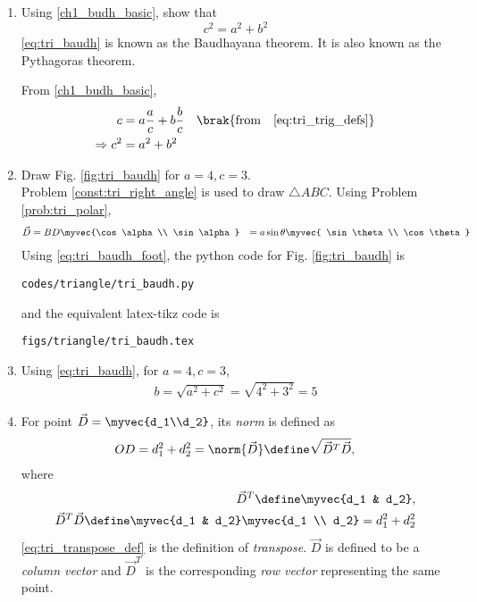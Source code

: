\begin{enumerate}[label=\arabic*.,ref=\thesubsection.\theenumi]
\item
	Using \eqref{ch1_budh_basic}, show that
	\begin{equation}
	\label{eq:tri_baudh}
	c^2 = a^2 + b^2
	\end{equation}
	\eqref{eq:tri_baudh} is known as the Baudhayana theorem.  It is also known as the Pythagoras theorem.

\solution From \eqref{ch1_budh_basic},
\begin{align}
c &= a\frac{a}{c} + b \frac{b}{c} \quad \brak{\text{from} \quad \eqref{eq:tri_trig_defs}}\\
\Rightarrow c^2 &= a^2 + b^2
\end{align}
%
%
\item Draw Fig. \ref{fig:tri_baudh} for $a = 4, c =3$.
\label{const:tri_baudh}
%
\\
\solution Problem \ref{const:tri_right_angle} is used to draw $\triangle ABC$.
%
Using Problem \ref{prob:tri_polar},
\begin{align}
\vec{D} &= BD\myvec{\cos \alpha\\  \sin \alpha} 
&= a \sin \theta \myvec{ \sin \theta \\ \cos \theta } 
\label{eq:tri_baudh_foot}
\end{align}
%
Using \eqref{eq:tri_baudh_foot}, the python code for  Fig. \ref{fig:tri_baudh} is
\begin{lstlisting}
codes/triangle/tri_baudh.py
\end{lstlisting}
%
and the equivalent latex-tikz code is
%
\begin{lstlisting}
figs/triangle/tri_baudh.tex
\end{lstlisting}
%
\item Using 	\eqref{eq:tri_baudh}, for $a = 4, c = 3$,
%
\begin{align}
b = \sqrt{a^2+c^2} = \sqrt{4^2+3^2} = 5
\end{align}
%
\item For  point $\vec{D} = \myvec{d_1\\d_2}$, its {\em norm} is defined as
%
\begin{align}
OD = d_1^2+d_2^2 = \norm{\vec{D}} \define \sqrt{\vec{D}^T\vec{D}}, 
\label{eq:tri_norm_def}
\end{align}
%
where 
%
\begin{align}
\label{eq:tri_transpose_def}
 \vec{D}^T  \define \myvec{d_1 & d_2},
\\
\vec{D}^T\vec{D} \define \myvec{d_1 & d_2} \myvec{d_1 \\ d_2} = d_1^2+d_2^2
\end{align}
%
\eqref{eq:tri_transpose_def} is the definition of {\em transpose}. $\vec{D}$ is defined to be a {\em column vector} and $\vec{D}^T$  is the corresponding {\em row vector} representing the same point.


\end{enumerate}
